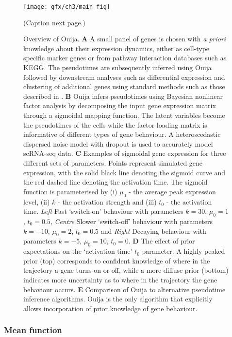 \begin{figure}%
	\centering
	\texttt{[image: gfx/ch3/main\_fig]}
  \caption[]{(Caption next page.)} \label{fig:main}
\end{figure}
\addtocounter{figure}{-1}
\begin{figure}
  \caption[Overview of Ouija.]{Overview of Ouija.
  \textbf{A} A small panel of genes is chosen with \emph{a priori} knowledge about their expression dynamics, either as cell-type specific marker genes or from pathway interaction databases such as KEGG. The pseudotimes are subsequently inferred using Ouija followed by downstream analyses such as differential expression and clustering of additional genes  using standard methods such as those described in \cite{Trapnell2014-xi}.
  \textbf{B} Ouija infers pseudotimes using Bayesian nonlinear factor analysis by decomposing the input gene expression matrix through a sigmoidal mapping function. The latent variables become the pseudotimes of the cells while the factor loading matrix is informative of different types of gene behaviour. A heteroscedastic dispersed noise model with dropout is used to accurately model scRNA-seq data.
  \textbf{C}  Examples of sigmoidal gene expression for three different sets of parameters. Points represent simulated gene expression, with the solid black line denoting the sigmoid curve and the red dashed line denoting the activation time.
  The sigmoid function is parameterised by (i) $\mu_0$ - the average peak expression level, (ii) $k$ - the activation strength and (iii) $t_0$ - the activation time. \emph{Left} Fast `switch-on' behaviour with parameters $k= 30$, $\mu_0 = 1$, $t_0 = 0.5$, \emph{Centre} Slower `switch-off' behaviour with parameters $k= -10$, $\mu_0 = 2$, $t_0 = 0.5$ and \emph{Right} Decaying behaviour with parameters $k= -5$, $\mu_0 = 10$, $t_0 = 0$.
  \textbf{D} The effect of prior expectations on the `activation time' $t_0$ parameter. A highly peaked prior (top) corresponds to confident knowledge of where in the trajectory a gene turns on or off, while a more diffuse prior (bottom) indicates more uncertainty as to where in the trajectory the gene behaviour occurs.
  \textbf{E} Comparison of Ouija to alternative pseudotime inference algorithms. Ouija is the only algorithm that explicitly allows incorporation of prior knowledge of gene behaviour.}
\end{figure}


\subsubsection{Mean function}

